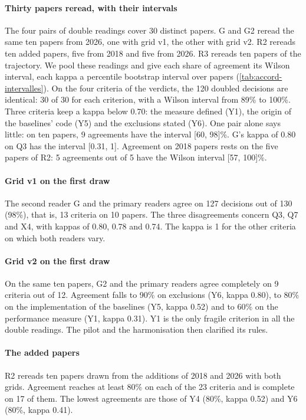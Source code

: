 \paragraph{Thirty papers reread, with their intervals}
The four pairs of double readings cover 30 distinct papers. G and G2 reread the same ten papers from 2026, one
with grid v1, the other with grid v2. R2 rereads ten added papers, five from 2018 and five from 2026. R3 rereads
ten papers of the trajectory. We pool these readings and
give each share of agreement its Wilson interval, each kappa a percentile bootstrap interval over papers
(\cref{tab:accord-intervalles}). On the four criteria of the verdicts, the 120 doubled decisions are identical:
30 of 30 for each criterion, with a Wilson interval from 89\% to 100\%. Three criteria keep a kappa below 0.70:
the measure defined (Y1), the origin of the baselines' code (Y5) and the exclusions stated (Y6). One pair alone
says little: on ten papers, 9 agreements have the interval [60, 98]\%. G's kappa of 0.80 on Q3 has the
interval [0.31, 1]. Agreement on 2018 papers rests on the five papers of R2: 5 agreements out of 5 have the
Wilson interval [57, 100]\%.


\paragraph{Grid v1 on the first draw}
The second reader G and the primary readers agree on 127 decisions out of 130 (98\%), that is, 13
criteria on 10 papers. The three disagreements concern Q3, Q7 and X4, with kappas of 0.80, 0.78 and
0.74. The kappa is 1 for the other criteria on which both readers vary.

\paragraph{Grid v2 on the first draw}
On the same ten papers, G2 and the primary readers agree completely on 9 criteria out of 12. Agreement
falls to 90\% on exclusions (Y6, kappa 0.80), to 80\% on the implementation of the baselines (Y5, kappa
0.52) and to 60\% on the performance measure (Y1, kappa 0.31). Y1 is the only fragile criterion in all
the double readings. The pilot and the harmonisation then clarified its rules.

\paragraph{The added papers}
R2 rereads ten papers drawn from the additions of 2018 and 2026 with both grids. Agreement reaches at
least 80\% on each of the 23 criteria and is complete on 17 of them. The lowest agreements are those of
Y4 (80\%, kappa 0.52) and Y6 (80\%, kappa 0.41).

